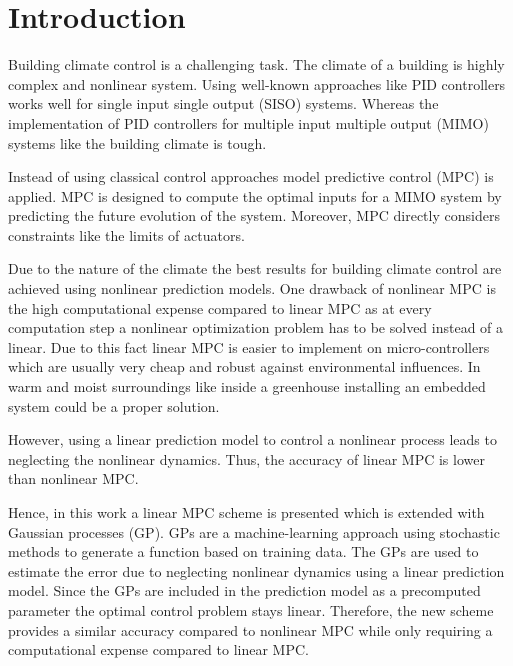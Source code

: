 \chapter{Introduction}
\label{cha:introduction}

Building climate control is a challenging task.
The climate of a building is highly complex and nonlinear system.
Using well-known approaches like PID controllers works well for single input single output (SISO) systems.
Whereas the implementation of PID controllers for multiple input multiple output (MIMO) systems like the building climate is tough.

Instead of using classical control approaches model predictive control (MPC) is applied.
MPC is designed to compute the optimal inputs for a MIMO system by predicting the future evolution of the system.
Moreover, MPC directly considers constraints like the limits of actuators.

Due to the nature of the climate the best results for building climate control are achieved using nonlinear prediction models.
One drawback of nonlinear MPC is the high computational expense compared to linear MPC as at every computation step a nonlinear optimization problem has to be solved instead of a linear.
Due to this fact linear MPC is easier to implement on micro-controllers which are usually very cheap and robust against environmental influences.
In warm and moist surroundings like inside a greenhouse installing an embedded system could be a proper solution.

However, using a linear prediction model to control a nonlinear process leads to neglecting the nonlinear dynamics.
Thus, the accuracy of linear MPC is lower than nonlinear MPC.

Hence, in this work a linear MPC scheme is presented which is extended with Gaussian processes (GP).
GPs are a machine-learning approach using stochastic methods to generate a function based on training data.
The GPs are used to estimate the error due to neglecting nonlinear dynamics using a linear prediction model.
Since the GPs are included in the prediction model as a precomputed parameter the optimal control problem stays linear.
Therefore, the new scheme provides a similar accuracy compared to nonlinear MPC while only requiring a computational expense compared to linear MPC.\par\medskip

